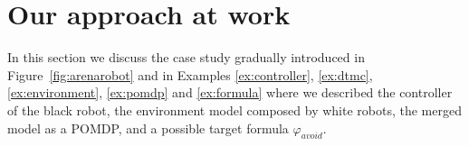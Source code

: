 \vspace{-.3cm}
\section{Our approach at work} %
\label{sec:case_studies}

In this section we discuss the case study gradually introduced in Figure~\ref{fig:arenarobot} and in Examples \ref{ex:controller}, \ref{ex:dtmc}, \ref{ex:environment}, \ref{ex:pomdp} and \ref{ex:formula} where we described the controller of the black robot, the environment model composed by white robots, the merged model as a \ac{POMDP}, and a possible target formula $\varphi_{avoid}$.




